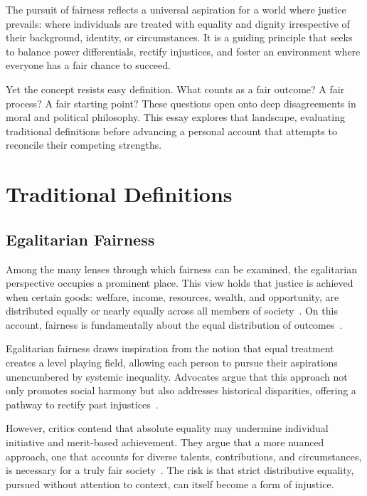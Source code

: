 \documentclass[11pt,showkeys]{../../shared/essay}
\begin{document}
The pursuit of fairness reflects a universal aspiration for a world where justice prevails: where individuals are treated with equality and dignity irrespective of their background, identity, or circumstances. It is a guiding principle that seeks to balance power differentials, rectify injustices, and foster an environment where everyone has a fair chance to succeed.

Yet the concept resists easy definition. What counts as a fair outcome? A fair process? A fair starting point? These questions open onto deep disagreements in moral and political philosophy. This essay explores that landscape, evaluating traditional definitions before advancing a personal account that attempts to reconcile their competing strengths.

\section{Traditional Definitions}

\subsection{Egalitarian Fairness}

Among the many lenses through which fairness can be examined, the egalitarian perspective occupies a prominent place. This view holds that justice is achieved when certain goods: welfare, income, resources, wealth, and opportunity, are distributed equally or nearly equally across all members of society~\cite{temkin_equality_2019,afolayan_egalitarianism_2015}. On this account, fairness is fundamentally about the equal distribution of outcomes~\cite{eldridge_egalitarianism_2023,johnson_psychology_2023}.

Egalitarian fairness draws inspiration from the notion that equal treatment creates a level playing field, allowing each person to pursue their aspirations unencumbered by systemic inequality. Advocates argue that this approach not only promotes social harmony but also addresses historical disparities, offering a pathway to rectify past injustices~\cite{baiasu_why_2020}.

However, critics contend that absolute equality may undermine individual initiative and merit-based achievement. They argue that a more nuanced approach, one that accounts for diverse talents, contributions, and circumstances, is necessary for a truly fair society~\cite{temkin_equality_2019}. The risk is that strict distributive equality, pursued without attention to context, can itself become a form of injustice.
\end{document}
